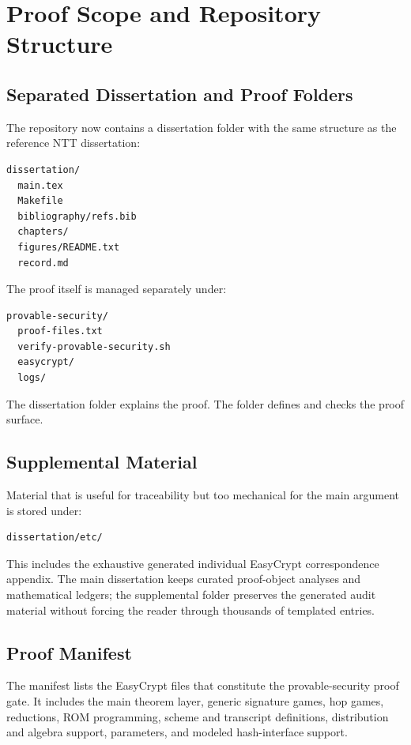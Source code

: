 \chapter{Proof Scope and Repository Structure}
\label{ch:proof-scope}

\section{Separated Dissertation and Proof Folders}

The repository now contains a dissertation folder with the same structure as the
reference NTT dissertation:

\begin{lstlisting}[language=bash]
dissertation/
  main.tex
  Makefile
  bibliography/refs.bib
  chapters/
  figures/README.txt
  record.md
\end{lstlisting}

The proof itself is managed separately under:

\begin{lstlisting}[language=bash]
provable-security/
  proof-files.txt
  verify-provable-security.sh
  easycrypt/
  logs/
\end{lstlisting}

The dissertation folder explains the proof.  The 
folder defines and checks the proof surface.

\section{Supplemental Material}

Material that is useful for traceability but too mechanical for the main
argument is stored under:

\begin{lstlisting}[language=bash]
dissertation/etc/
\end{lstlisting}

This includes the exhaustive generated individual EasyCrypt correspondence
appendix.  The main dissertation keeps curated proof-object analyses and
mathematical ledgers; the supplemental folder preserves the generated audit
material without forcing the reader through thousands of templated entries.

\section{Proof Manifest}

The manifest lists the EasyCrypt files that constitute the provable-security
proof gate.  It includes the main theorem layer, generic signature games, hop
games, reductions, ROM programming, scheme and transcript definitions,
distribution and algebra support, parameters, and modeled hash-interface support.

